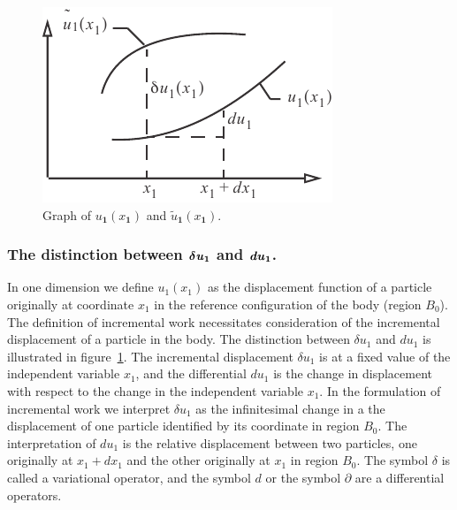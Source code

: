 \documentclass{AeroStructure-ERJohnson}
\begin{document}
\begin{figure}
\vspace*{-19pt}
\includegraphics{Figure_A-9.pdf}
\caption{Graph of $u_{\textbf{1}}(x_{\textbf{1}})$ and $\tilde{u}_{\textbf{1}}(x_{\textbf{1}})$.\label{figA.9}}
\vspace*{-1pc}
\end{figure}

\subsubsection{The distinction between $\boldsymbol{\delta} \textbf{\textit{u}}_{\textbf{1}}$ and $\textbf{\textit{du}}_{\textbf{1}}$.} In one dimension we define $u_{1}(x_{1})$ as the displacement function of a particle originally at coordinate $x_{1}$ in the reference configuration of the body (region $B_{0}$). The definition of incremental work necessitates consideration of the incremental displacement of a particle in the body. The distinction between $\delta u_{1}$ and $d u_{1}$ is illustrated in figure~\ref{figA.9}. The incremental displacement $\delta u_{1}$ is at a fixed value of the independent variable $x_{1}$, and the differential $d u_{1}$ is the change in displacement with respect to the change in the independent variable $x_{1}$. In the formulation of incremental work we interpret $\delta u_{1}$ as the infinitesimal change in a the displacement of one particle identified by its coordinate in region $B_{0}$. The interpretation of $d u_{1}$ is the relative displacement between two particles, one originally at $x_{1}+d x_{1}$ and the other originally at $x_{1}$ in region $B_{0}$. The symbol $\delta$ is called a variational operator, and the symbol $d$ or the symbol $\partial$ are a differential operators.
\end{document}
